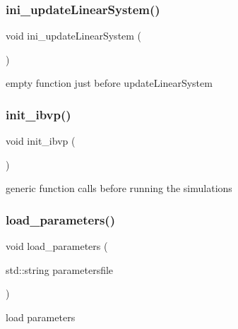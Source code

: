 \mbox{\label{classmechano_chem_f_e_m_a295e0565636db5e7b8d22639182de706}} 
\subsubsection{\texorpdfstring{ini\_updateLinearSystem()}{ini\_updateLinearSystem()}}
{\footnotesize\ttfamily void ini\+\_\+update\+Linear\+System (\begin{DoxyParamCaption}{ }\end{DoxyParamCaption})\hspace{0.3cm}{\ttfamily [virtual]}}

empty function just before update\+Linear\+System \mbox{\label{classmechano_chem_f_e_m_ad01ab2c3347ff55e8787624a97732182}} 
\subsubsection{\texorpdfstring{init\_ibvp()}{init\_ibvp()}}
{\footnotesize\ttfamily void init\+\_\+ibvp (\begin{DoxyParamCaption}{ }\end{DoxyParamCaption})\hspace{0.3cm}{\ttfamily [virtual]}}

generic function calls before running the simulations \mbox{\label{classmechano_chem_f_e_m_a5d2215a9bdbd1f1726f1e9c2182d2072}} 
\subsubsection{\texorpdfstring{load\_parameters()}{load\_parameters()}}
{\footnotesize\ttfamily void load\+\_\+parameters (\begin{DoxyParamCaption}\item[{std\+::string}]{parametersfile }\end{DoxyParamCaption})}

load parameters \mbox{\label{classmechano_chem_f_e_m_aadd4943e52767516f3f7c5460ea35032}} 
